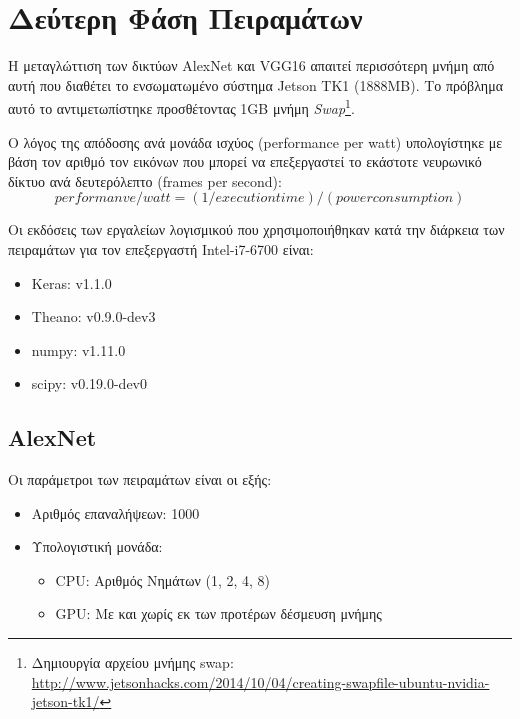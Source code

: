 \section{Δεύτερη Φάση Πειραμάτων}
\label{sec:experiments_phase2}

Η μεταγλώττιση των δικτύων AlexNet και VGG16 απαιτεί περισσότερη
μνήμη από αυτή που διαθέτει το ενσωματωμένο σύστημα Jetson TK1 (1888MB).
Το πρόβλημα αυτό το αντιμετωπίστηκε προσθέτοντας 1GB μνήμη
\emph{Swap}\footnote{Δημιουργία αρχείου μνήμης swap: \url{http://www.jetsonhacks.com/2014/10/04/creating-swapfile-ubuntu-nvidia-jetson-tk1/}}.

Ο λόγος της απόδοσης ανά μονάδα ισχύος (performance per watt) υπολογίστηκε
με βάση τον αριθμό τον εικόνων που μπορεί να επεξεργαστεί το εκάστοτε
νευρωνικό δίκτυο ανά δευτερόλεπτο (frames per second):
\begin{equation*}
  performanve / watt = (1 / execution time) / (power consumption)
\end{equation*}

Οι εκδόσεις των εργαλείων λογισμικού που χρησιμοποιήθηκαν
κατά την διάρκεια των πειραμάτων για τον επεξεργαστή Intel-i7-6700 είναι:
\begin{itemize}
  \item{Keras: v1.1.0}
  \item{Theano: v0.9.0-dev3}
  \item{numpy: v1.11.0}
  \item{scipy: v0.19.0-dev0}
\end{itemize}


\subsection{AlexNet}

Οι παράμετροι των πειραμάτων είναι οι εξής:
\begin{itemize}
  \item{Αριθμός επαναλήψεων: 1000}
  \item{Υπολογιστική μονάδα:}
    \begin{itemize}
      \item{CPU: Αριθμός Νημάτων (1, 2, 4, 8)}
      \item{GPU: Με και χωρίς εκ των προτέρων δέσμευση μνήμης}
    \end{itemize}
\end{itemize}

